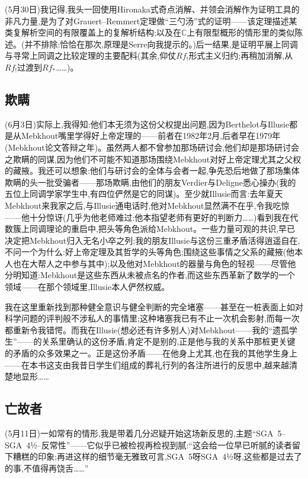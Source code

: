 (5月30日)我记得,我头一回使用Hironaka式奇点消解、并领会消解作为证明工具的非凡力量,是为了对Grauert--Remmert定理做“三勺汤”式的证明——该定理描述某类复解析空间的有限覆盖上的复解析结构;以及在$\mathbb{C}$上有限型概形的情形里的类似陈述。(并不排除:恰恰在那次,原理是Serre向我提示的。)后一结果,是证明平展上同调与寻常上同调之比较定理的主要配料(其余,仰仗$Rf_!$形式主义归约;再稍加消解,从$Rf_!$过渡到$Rf_*$……)。

\subsection{欺瞒}


(6月3日)实际上,我得知:他们本无须为这份父权提出问题,因为Berthelot与Illusie都是从Mebkhout嘴里学得好上帝定理的——前者在1982年2月,后者早在1979年(Mebkhout论文答辩之年)。虽然两人都不曾参加那场研讨会,他们却是那场研讨会之欺瞒的同谋,因为\dmark{}他们不可能不知道那场围绕Mebkhout对好上帝定理尤其之父权的藏掖。我还可以想象:他们与研讨会的全体与会者一起,争先恐后地做了那场集体欺瞒的头一批受骗者——那场欺瞒,由他们的朋友Verdier与Deligne悉心操办(我的五位上同调学家学生中,有四位俨然是它的同谋)。至少就Illusie而言:去年夏天Mebkhout来我家之后,与Illusie通电话时,他对Mebkhout显然满不在乎,令我吃惊——他十分惊讶(几乎为他老师难过:他本指望老师有更好的判断力……)看到我在代数簇上同调理论的重启中,把头等角色派给Mebkhout。一些力量可观的共识,早已决定把Mebkhout归入无名小卒之列;我的朋友Illusie与这份三重矛盾活得逍遥自在,不问一个为什么:好上帝定理及其哲学的头等角色;围绕这些事情之父系的藏掖(他本人也在大帮人之中参与其中);以及他对Mebkhout的器量与角色的轻视——尽管他分明知道:Mebkhout是这些东西从未被点名的作者,而这些东西革新了数学的一个领域——在那个领域里,Illusie本人俨然权威。

我在这里重新找到那种健全意识与健全判断的完全堵塞——甚至在一桩表面上如对科学问题的评判般不涉私人的事情里;这种堵塞我已有不止一次机会影射,而每一次都重新令我错愕。而我在Illusie(想必还有许多别人)对Mebkhout——我的“遗孤学生”——的关系里确认的这份矛盾,肯定不是别的,正是他与我的关系中那桩更关键的矛盾的众多效果之一。正是这份矛盾——在他身上尤其,也在我的其他学生身上——在本书这支由我昔日学生们组成的葬礼行列的各注所进行的反思中,越来越清楚地显形……

\subsection{亡故者}


(5月11日)一如常有的情形,我是带着几分迟疑开始这场新反思的,主题“SGA~5--SGA~4½--反常性”——它似乎已被检视再检视到腻:“这会给一位早已听腻的读者留下糟糕的印象;再进这样的细节毫无雅致可言,SGA~5呀SGA~4½呀,这些都是过去了的事,不值得再饶舌……”

